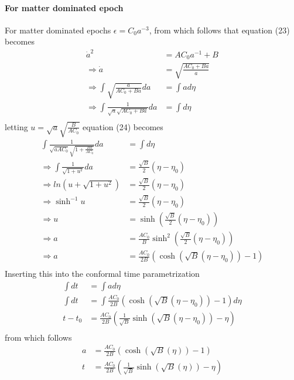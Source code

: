 \documentclass[a4paper, 11pt]{FSKH_623_Report}
\numberwithin{equation}{section}
\newcommand{\brac}[1]{\left(#1\right)}
\begin{document}
\paragraph*{For matter dominated epoch}
For matter dominated epochs $\epsilon=C_{0}a^{-3}$, from which follows that equation (23) becomes
\begin{equation}
\begin{split}
\dot{a}^{2} &= AC_{0}a^{-1}+B\\
\Rightarrow \dot{a} &= \sqrt{\frac{AC_{0}+Ba}{a}}\\
\Rightarrow \int\sqrt{\frac{a}{AC_{0}+Ba}}da &= \int ad\eta \\
\Rightarrow \int\frac{1}{\sqrt{a}\sqrt{AC_{0}+Ba}}da &= \int d\eta \\
\end{split}
\end{equation}
letting $u=\sqrt{a}\sqrt{\frac{B}{AC_{0}}}$ equation (24) becomes
\begin{equation}
\begin{split}
\int\frac{1}{\sqrt{aAC_{0}}\sqrt{1+\frac{Ba}{AC_{0}}}}da &= \int d\eta \\
\Rightarrow \int\frac{1}{\sqrt{1+u^{2}}}da &= \frac{\sqrt{B}}{2}\brac{\eta-\eta_{0}}\\
\Rightarrow ln\brac{u+\sqrt{1+u^{2}}} &= \frac{\sqrt{B}}{2}\brac{\eta-\eta_{0}}\\
\Rightarrow \sinh^{-1}u &= \frac{\sqrt{B}}{2}\brac{\eta-\eta_{0}}\\
\Rightarrow u &= \sinh\brac{\frac{\sqrt{B}}{2}\brac{\eta-\eta_{0}}}\\
\Rightarrow a &= \frac{AC_{0}}{B}\sinh^{2}\brac{\frac{\sqrt{B}}{2}\brac{\eta-\eta_{0}}}\\
\Rightarrow a &= \frac{AC_{0}}{2B}\brac{\cosh\brac{\sqrt{B}\brac{\eta-\eta_{0}}}-1}\\
\end{split}
\end{equation}
Inserting this into the conformal time parametrization 
\begin{equation}
\begin{split}
\int dt &= \int ad\eta\\
\int dt &= \int \frac{AC_{0}}{2B}\brac{\cosh\brac{\sqrt{B}\brac{\eta-\eta_{0}}}-1} d\eta\\
t-t_{0} &= \frac{AC_{0}}{2B}\brac{\frac{1}{\sqrt{B}}\sinh\brac{\sqrt{B}\brac{\eta-\eta_{0}}}-\eta}\\
\end{split}
\end{equation}
from which follows
\begin{equation}
\begin{split}
a &= \frac{AC_{0}}{2B}\brac{\cosh\brac{\sqrt{B}\brac{\eta}}-1}\\
t &= \frac{AC_{0}}{2B}\brac{\frac{1}{\sqrt{B}}\sinh\brac{\sqrt{B}\brac{\eta}}-\eta}\\
\end{split}
\end{equation}
\end{document}
